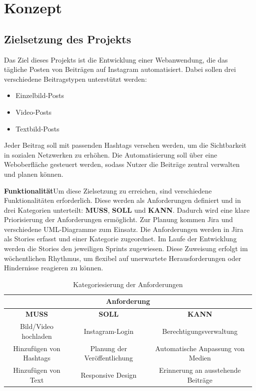 \chapter{Konzept}
\label{sec:chapter1}

\section{Zielsetzung des Projekts}
\label{sec:chapter1-1}

Das Ziel dieses Projekts ist die Entwicklung einer Webanwendung, die das tägliche Posten von Beiträgen auf Instagram automatisiert. Dabei sollen drei verschiedene 
Beitragstypen unterstützt werden:

\begin{itemize}
    \item Einzelbild-Posts
    \item Video-Posts
    \item Textbild-Posts
\end{itemize}

Jeder Beitrag soll mit passenden Hashtags versehen werden, um die Sichtbarkeit in sozialen Netzwerken zu erhöhen. Die Automatisierung soll über eine Weboberfläche 
gesteuert werden, sodass Nutzer die Beiträge zentral verwalten und planen können.

\textbf{Funktionalität}\quad Um diese Zielsetzung zu erreichen, sind verschiedene Funktionalitäten erforderlich. Diese werden als Anforderungen definiert und in 
drei Kategorien unterteilt: \textbf{MUSS}, \textbf{SOLL} und \textbf{KANN}. Dadurch wird eine klare Priorisierung der Anforderungen ermöglicht. Zur Planung 
kommen Jira und verschiedene UML-Diagramme zum Einsatz. Die Anforderungen werden in Jira als Stories erfasst und einer Kategorie zugeordnet. Im Laufe der Entwicklung 
werden die Stories den jeweiligen Sprints zugewiesen. Diese Zuweisung erfolgt im wöchentlichen Rhythmus, um flexibel auf unerwartete Herausforderungen oder Hindernisse 
reagieren zu können.

\begin{table}[htb]
    \centering
    \renewcommand{\arraystretch}{1.3} %
    \begin{tabular}{|c|c|c|}
        \hline
        \multicolumn{3}{|c|}{\textbf{Anforderung}} \\ \hline
        \textbf{MUSS} & \textbf{SOLL} & \textbf{KANN} \\ \hline
        Bild/Video hochladen & Instagram-Login & Berechtigungsverwaltung \\ \hline
        Hinzufügen von Hashtags & Planung der Veröffentlichung & Automatische Anpassung von Medien \\ \hline
        Hinzufügen von Text & Responsive Design & Erinnerung an ausstehende Beiträge \\ \hline
    \end{tabular}
    \caption{Kategoriesierung der Anforderungen}
    \label{tab:tab-1}
\end{table}

